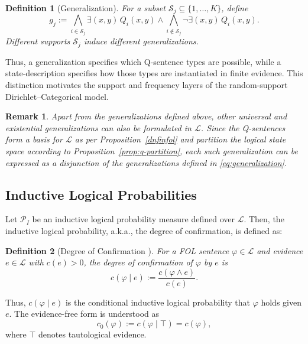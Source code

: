 \documentclass[10pt, conference, letterpaper]{ IEEEtran}
\theoremstyle{bfnote}
\newtheorem{remark}{Remark}
\newtheorem{definition}{Definition}
\newcommand{\Language}{\mathcal{L}} %
\newcommand{\ProbMeas}{\mathcal{P}_{I}} %
\begin{document}
\begin{definition}[Generalization] 
\label{def:generalization} 
For a subset $\mathcal{S}_j\subseteq\{1,\ldots,K\}$, define 
\begin{equation} 
\label{eq:generalization} 
g_j:={} \bigwedge_{i\in\mathcal{S}_j} \exists (x, y)\, Q_i(x,y) \land \bigwedge_{i\notin\mathcal{S}_j} \neg\exists (x, y)\, Q_i(x,y). 
\end{equation} 
Different supports $\mathcal{S}_j$ induce different generalizations.
\end{definition}
Thus, a generalization specifies
which Q-sentence types are possible, while a state-description specifies
how those types are instantiated in finite evidence. This distinction
motivates the support and frequency layers of the random-support
Dirichlet--Categorical model. 
\begin{remark}
    Apart from the generalizations defined above, other universal and existential generalizations can also be formulated in $\Language$. Since the
Q-sentences form a basis for $\Language$ as per Proposition~\ref{dnfinfol} and partition the logical state space
according to Proposition~\ref{prop:q-partition}, each such generalization can
be expressed as a disjunction of the generalizations defined in
\eqref{eq:generalization}.
\end{remark}

\subsection{Inductive Logical Probabilities}

Let $\ProbMeas$ be an inductive logical probability measure defined over $\Language$. Then, the inductive logical probability, a.k.a., the degree of confirmation, is defined as:

\begin{definition}[Degree of Confirmation {\cite{c2}}]
\label{degofconf}
For a FOL sentence $\varphi\in\Language$ and evidence $e\in\Language$ with
$c(e)>0$, the \emph{degree of confirmation} of $\varphi$ by $e$ is
\begin{equation}
\label{eq:degree-confirmation}
c(\varphi\mid e)
:=
\frac{c(\varphi\land e)}{c(e)}.
\end{equation}
\end{definition}

Thus, $c(\varphi\mid e)$ is the conditional inductive logical probability
that $\varphi$ holds given $e$. The evidence-free form is understood as
\begin{equation}
\label{eq:prior-confirmation}
c_0(\varphi)
:=
c(\varphi\mid\top)
=
c(\varphi),
\end{equation}
where $\top$ denotes tautological evidence. 
\end{document}
